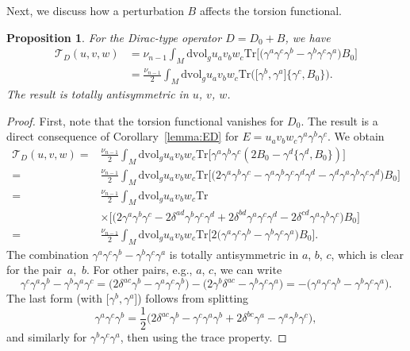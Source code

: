 \documentclass[pdftex]{sigma}
\numberwithin{equation}{section}
\newtheorem{Proposition}[Theorem]{Proposition}
\theoremstyle{definition}
\def\Tr{\mathrm{Tr}}
\def\dv{\mathrm{dvol}_g}
\begin{document}
Next, we discuss how a perturbation $B$ affects the torsion functional.
\begin{Proposition}\label{prop:ogolna_torsja}
	For the Dirac-type operator $D=D_0+B$, we have
	\begin{align*}
			\mathscr{T}_D(u,v,w)&=
			\nu_{n-1}\int_M \dv u_av_bw_c\Tr\bigl[\bigl(\gamma^a\gamma^c\gamma^b-\gamma^b\gamma^c\gamma^a\bigr)B_0\bigr]\\
			&=\frac{\nu_{n-1}}{2}\int_M \dv u_av_bw_c\Tr\bigl(\bigl[\gamma^b,\gamma^a\bigr]\{\gamma^c,B_0\}\bigr).
		\end{align*}
	The result is totally antisymmetric in $u$, $v$, $w$.
\end{Proposition}
\begin{proof}
	First, note that the torsion functional vanishes for $D_0$. The result is a direct consequence of Corollary~\ref{lemma:ED} for $E=u_av_bw_c\gamma^a\gamma^b\gamma^c$. We obtain
		\begin{align*}
			\mathscr{T}_D(u,v,w)={}&\frac{\nu_{n-1}}{2}\int_M \dv u_av_bw_c\Tr\bigl[\gamma^a\gamma^b\gamma^c(2B_0-\gamma^d\bigl\{\gamma^d,B_0\bigr\})\bigr]\\
			={}&\frac{\nu_{n-1}}{2}\int_M \dv u_av_bw_c\Tr\bigl[\bigl(2\gamma^a\gamma^b\gamma^c-\gamma^a\gamma^b\gamma^c\gamma^d\gamma^d-\gamma^d\gamma^a\gamma^b\gamma^c\gamma^d\bigr)B_0\bigr]\\
			={}&\frac{\nu_{n-1}}{2}\int_M \dv u_av_bw_c\Tr\\
&\times\bigl[\bigl(2\gamma^a\gamma^b\gamma^c-2\delta^{ad}\gamma^b\gamma^c\gamma^d+2\delta^{bd}\gamma^a\gamma^c\gamma^d-2\delta^{cd}\gamma^a\gamma^b\gamma^c\bigr)B_0\bigr]\\
			={}&\frac{\nu_{n-1}}{2}\int_M \dv u_av_bw_c\Tr\bigl[2\bigl(\gamma^a\gamma^c\gamma^b-\gamma^b\gamma^c\gamma^a\bigr)B_0\bigr].
		\end{align*}
	The combination $\gamma^a\gamma^c\gamma^b-\gamma^b\gamma^c\gamma^a$ is totally antisymmetric in $a$, $b$, $c$, which is clear for the pair~$a$,~$b$. For other pairs, e.g., $a$, $c$, we can write
	\[
		\gamma^c\gamma^a\gamma^b-\gamma^b\gamma^a\gamma^c
=\bigl(2\delta^{ac}\gamma^b-\gamma^a\gamma^c\gamma^b\bigr)-\bigl(2\gamma^b\delta^{ac}-\gamma^b\gamma^c\gamma^a\bigr)=-\bigl(\gamma^a\gamma^c\gamma^b-\gamma^b\gamma^c\gamma^a\bigr).
	\]
	The last form (with $\bigl[\gamma^b,\gamma^a\bigr]$) follows from splitting
	\[
		\gamma^a\gamma^c\gamma^b=\frac12\bigl(2\delta^{ac}\gamma^b-\gamma^c\gamma^a\gamma^b+2\delta^{bc}\gamma^a-\gamma^a\gamma^b\gamma^c\bigr),
	\]
	and similarly for $\gamma^b\gamma^c\gamma^a$, then using the trace property.
\end{proof}
\end{document}
